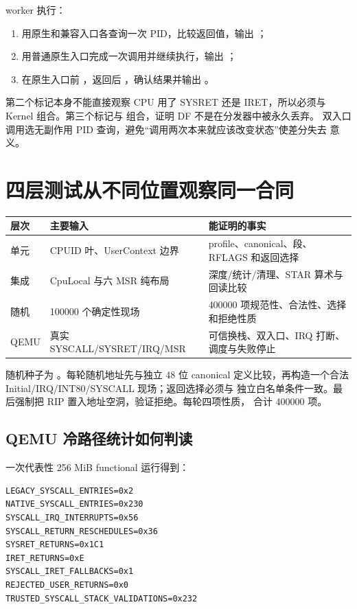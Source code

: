 worker 执行：

\begin{enumerate}[label=\arabic*.]
  \item 用原生和兼容入口各查询一次 PID，比较返回值，输出
    ；
  \item 用普通原生入口完成一次调用并继续执行，输出
    ；
  \item 在原生入口前 ，返回后 ，确认结果并输出
    。
\end{enumerate}

第二个标记本身不能直接观察 CPU 用了 SYSRET 还是 IRET，所以必须与 Kernel
 组合。第三个标记与
 组合，证明 DF 不是在分发器中被永久丢弃。
双入口调用选无副作用 PID 查询，避免“调用两次本来就应该改变状态”使差分失去
意义。

\section{四层测试从不同位置观察同一合同}

\begin{longtable}{L{0.17\textwidth}L{0.30\textwidth}L{0.41\textwidth}}
\toprule
层次 & 主要输入 & 能证明的事实\\
\midrule
单元 & CPUID 叶、UserContext 边界 & profile、canonical、段、RFLAGS 和返回选择\\
集成 & CpuLocal 与六 MSR 纯布局 & 深度/统计/清理、STAR 算术与回读比较\\
随机 & 100000 个确定性现场 & 400000 项规范性、合法性、选择和拒绝性质\\
QEMU & 真实 SYSCALL/SYSRET/IRQ/MSR & 可信换栈、双入口、IRQ 打断、调度与失败停止\\
\bottomrule
\end{longtable}

随机种子为 。每轮随机地址先与独立 48 位 canonical
定义比较，再构造一个合法 Initial/IRQ/INT80/SYSCALL 现场；返回选择必须与
独立白名单条件一致。最后强制把 RIP 置入地址空洞，验证拒绝。每轮四项性质，
合计 400000 项。

\subsection{QEMU 冷路径统计如何判读}

一次代表性 256 MiB functional 运行得到：

\begin{lstlisting}[caption={v1.3 原生入口代表性统计}]
LEGACY_SYSCALL_ENTRIES=0x2
NATIVE_SYSCALL_ENTRIES=0x230
SYSCALL_IRQ_INTERRUPTS=0x56
SYSCALL_RETURN_RESCHEDULES=0x36
SYSRET_RETURNS=0x1C1
IRET_RETURNS=0xE
SYSCALL_IRET_FALLBACKS=0x1
REJECTED_USER_RETURNS=0x0
TRUSTED_SYSCALL_STACK_VALIDATIONS=0x232
\end{lstlisting}

